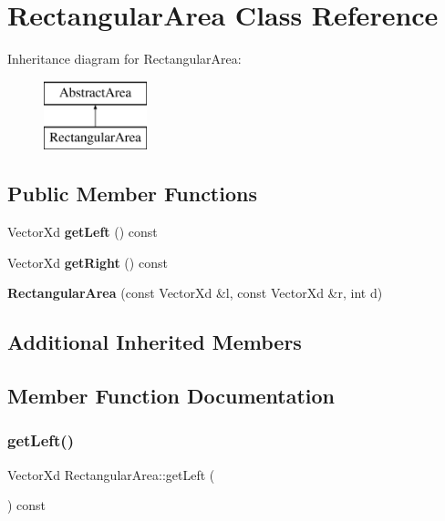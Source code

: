 \section{Rectangular\+Area Class Reference}
\label{class_rectangular_area}
Inheritance diagram for Rectangular\+Area\+:\begin{figure}[H]
\begin{center}
\leavevmode
\includegraphics[height=2.000000cm]{class_rectangular_area}
\end{center}
\end{figure}
\subsection*{Public Member Functions}
\begin{DoxyCompactItemize}
\item 
Vector\+Xd \textbf{ get\+Left} () const
\item 
Vector\+Xd \textbf{ get\+Right} () const
\item 
\mbox{\label{class_rectangular_area_a24391dafbb67092f7670b40f5e10508f}} 
{\bfseries Rectangular\+Area} (const Vector\+Xd \&l, const Vector\+Xd \&r, int d)
\end{DoxyCompactItemize}
\subsection*{Additional Inherited Members}


\subsection{Member Function Documentation}
\mbox{\label{class_rectangular_area_a1e1c3de69c38826425015ce56b2db72b}} 
\subsubsection{get\+Left()}
{\footnotesize\ttfamily Vector\+Xd Rectangular\+Area\+::get\+Left (\begin{DoxyParamCaption}{ }\end{DoxyParamCaption}) const}

